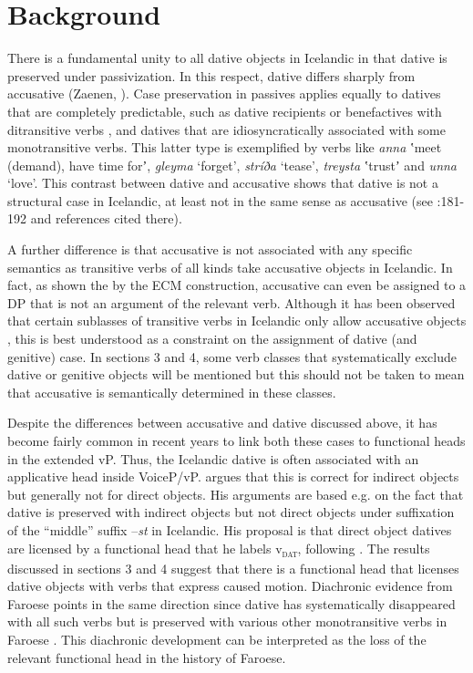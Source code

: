 \section{Background} %

There is a fundamental unity to all dative objects in Icelandic in that dative is preserved under passivization. In this respect, dative differs sharply from accusative (Zaenen, \citealt{MalingThráinsson1985}). Case preservation in passives applies equally to datives that are completely predictable, such as dative recipients or benefactives with ditransitive verbs \citep{Jónsson2000}, and datives that are idiosyncratically associated with some monotransitive verbs. This latter type is exemplified by verbs like \textit{anna} ʽmeet (demand), have time forʼ, \textit{gleyma} ‘forget’, \textit{stríða} ‘tease’, \textit{treysta} ʽtrustʼ and \textit{unna} ‘love’. This contrast between dative and accusative shows that dative is not a structural case in Icelandic, at least not in the same sense as accusative (see \citealt{Thráinsson2007}:181-192 and references cited there).

A further difference is that accusative is not associated with any specific semantics as transitive verbs of all kinds take accusative objects in Icelandic. In fact, as shown the by the ECM construction, accusative can even be assigned to a DP that is not an argument of the relevant verb. Although it has been observed that certain sublasses of transitive verbs in Icelandic only allow accusative objects \citep{Jónsson2013a}, this is best understood as a constraint on the assignment of dative (and genitive) case. In sections 3 and 4, some verb classes that systematically exclude dative or genitive objects will be mentioned but this should not be taken to mean that accusative is semantically determined in these classes.

Despite the differences between accusative and dative discussed above, it has become fairly common in recent years to link both these cases to functional heads in the extended vP. Thus, the Icelandic dative is often associated with an applicative head inside VoiceP/vP. \citet[128-138]{Wood2015} argues that this is correct for indirect objects but generally not for direct objects. His arguments are based e.g. on the fact that dative is preserved with indirect objects but not direct objects under suffixation of the “middle” suffix –\textit{st} in Icelandic. His proposal is that direct object datives are licensed by a functional head that he labels v\textsc{\textsubscript{dat}}, following \citet{Svenonius2006}. The results discussed in sections 3 and 4 suggest that there is a functional head that licenses dative objects with verbs that express caused motion. Diachronic evidence from Faroese points in the same direction since dative has systematically disappeared with all such verbs but is preserved with various other monotransitive verbs in Faroese \citep{Jónsson2009}. This diachronic development can be interpreted as the loss of the relevant functional head in the history of Faroese.

